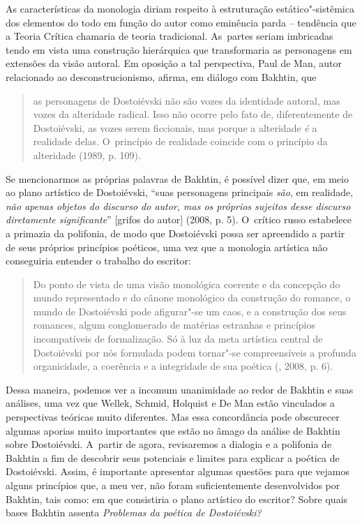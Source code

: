 As características da monologia diriam respeito à estruturação
estático"-sistêmica dos elementos do todo em função do autor como
eminência parda -- tendência que a Teoria Crítica chamaria de teoria
tradicional. As~partes seriam imbricadas tendo em vista uma construção
hierárquica que transformaria as personagens em extensões da visão
autoral. Em oposição a tal perspectiva, Paul de Man, autor relacionado
ao desconstrucionismo, afirma, em diálogo com Bakhtin, que

\begin{quote}
as personagens de Dostoiévski não são vozes da identidade autoral, mas
vozes da alteridade radical. Isso não ocorre pelo fato de,
diferentemente de Dostoiévski, as vozes serem ficcionais, mas porque a
alteridade \emph{é} a realidade delas. O~princípio de realidade coincide
com o princípio da alteridade (1989, p. 109).
\end{quote}

Se mencionarmos as próprias palavras de Bakhtin, é possível dizer que,
em meio ao plano artístico de Dostoiévski, ``suas personagens principais
\emph{são}, em realidade, \emph{não apenas objetos do discurso do autor,
mas os próprios sujeitos desse discurso diretamente significante}''
{[}grifos do autor{]} (2008, p. 5). O~crítico russo estabelece a
primazia da polifonia, de modo que Dostoiévski possa ser apreendido a
partir de seus próprios princípios poéticos, uma vez que a monologia
artística não conseguiria entender o trabalho do escritor:

\begin{quote}
Do ponto de vista de uma visão monológica coerente e da concepção do
mundo representado e do cânone monológico da construção do romance, o
mundo de Dostoiévski pode afigurar"-se um caos, e a construção dos seus
romances, algum conglomerado de matérias estranhas e princípios
incompatíveis de formalização. Só à luz da meta artística central de
Dostoiévski por nós formulada podem tornar"-se compreensíveis a profunda
organicidade, a coerência e a integridade de sua poética (, 2008,
p. 6).
\end{quote}

Dessa maneira, podemos ver a incomum unanimidade ao redor de Bakhtin e
suas análises, uma vez que Wellek, Schmid, Holquist e De Man estão
vinculados a perspectivas teóricas muito diferentes. Mas essa
concordância pode obscurecer algumas aporias muito importantes que estão
no âmago da análise de Bakhtin sobre Dostoiévski. A~partir de agora,
revisaremos a dialogia e a polifonia de Bakhtin a fim de descobrir seus
potenciais e limites para explicar a poética de Dostoiévski. Assim, é
importante apresentar algumas questões para que vejamos alguns
princípios que, a meu ver, não foram suficientemente desenvolvidos por
Bakhtin, tais como: em que consistiria o plano artístico do escritor?
Sobre quais bases Bakhtin assenta \emph{Problemas da poética de
Dostoiévski? }

